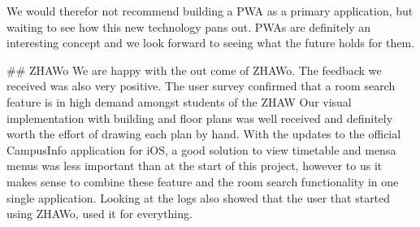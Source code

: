 \begin{markdown}
We would therefor not recommend building a PWA as a primary application, but waiting to see how this new technology pans out. PWAs are definitely an interesting concept and we look forward to seeing what the future holds for them.

## ZHAWo
We are happy with the out come of ZHAWo. The feedback we received was also very positive.
The user survey confirmed that a room search feature is in high demand amongst students of the ZHAW Our visual implementation with building and floor plans was well received and definitely worth the effort of drawing each plan by hand. With the updates to the official CampusInfo application for iOS, a good solution to view timetable and mensa menus was less important than at the start of this project, however to us it makes sense to combine these feature and the room search functionality in one single application. Looking at the logs also showed that the user that started using ZHAWo, used it for everything.

\end{markdown}

